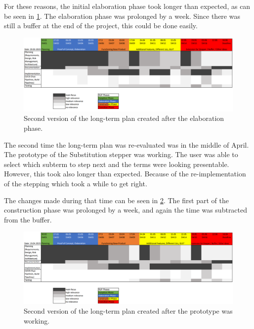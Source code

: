 For these reasons,
the initial elaboration phase took longer than expected,
as can be seen in \ref*{fig:longTermPlanMarch}.
The elaboration phase was prolonged by a week.
Since there was still a buffer at the end of the project,
this could be done easily.

\begin{figure}[!ht]
    \centering
    \includegraphics[width=0.96\textheight,angle=270]{resources/LongTermPlanMarch.PNG}
    \caption{Second version of the long-term plan created after the elaboration phase.}
    \label{fig:longTermPlanMarch}
\end{figure}

The second time the long-term plan was re-evaluated was in the middle of April.
The prototype of the Substitution stepper was working.
The user was able to select which subterm to step next and the terms were looking presentable.
However, this took also longer than expected.
Because of the re-implementation of the stepping which took a while to get right.

The changes made during that time can be seen in \ref*{fig:longTermPlanApril}.
The first part of the construction phase was prolonged by a week,
and again the time was subtracted from the buffer.

\begin{figure}[!ht]
    \centering
    \includegraphics[width=0.96\textheight,angle=270]{resources/LongTermPlanApril.PNG}
    \caption{Second version of the long-term plan created after the prototype was working.}
    \label{fig:longTermPlanApril}
\end{figure}

